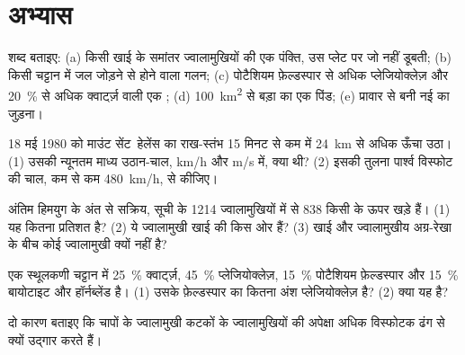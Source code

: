 \section{अभ्यास}

\begin{exercise}[$\star$]\label{exo:g12:subduction-magmatism:1}
शब्द बताइए: (a) किसी खाई के समांतर ज्वालामुखियों की एक पंक्ति, उस प्लेट पर
जो नहीं डूबती; (b) किसी चट्टान में जल जोड़ने से होने वाला गलन; (c) पोटैशियम
फ़ेल्डस्पार से अधिक प्लेजियोक्लेज़ और \qty{20}{\percent} से अधिक क्वार्ट्ज़ वाली एक
; (d) \qty{100}{km^2} से बड़ा  का
एक पिंड; (e) प्रावार से बनी नई  का
जुड़ना।
\end{exercise}

\begin{exercise}[$\star$]\label{exo:g12:subduction-magmatism:2}
18 मई 1980 को माउंट सेंट~हेलेंस का राख-स्तंभ 15 मिनट से कम में \qty{24}{km} से
अधिक ऊँचा उठा। (1) उसकी न्यूनतम माध्य उठान-चाल,
\unit{km/h} और \unit{m/s} में, क्या थी? (2) इसकी तुलना पार्श्व
विस्फोट की चाल, कम से कम \qty{480}{km/h}, से कीजिए।
\end{exercise}

\begin{exercise}[$\star$]\label{exo:g12:subduction-magmatism:3}
अंतिम हिमयुग के अंत से सक्रिय, सूची के 1214 ज्वालामुखियों में से
838 किसी  के ऊपर खड़े हैं। (1) यह कितना प्रतिशत है? (2) ये ज्वालामुखी
खाई की किस ओर हैं? (3) खाई और ज्वालामुखीय अग्र-रेखा के बीच कोई ज्वालामुखी
क्यों नहीं है?
\end{exercise}

\begin{exercise}[$\star$]\label{exo:g12:subduction-magmatism:4}
एक स्थूलकणी चट्टान में \qty{25}{\percent} क्वार्ट्ज़, \qty{45}{\percent}
प्लेजियोक्लेज़, \qty{15}{\percent} पोटैशियम फ़ेल्डस्पार और \qty{15}{\percent}
बायोटाइट और हॉर्नब्लेंड है। (1) उसके फ़ेल्डस्पार का कितना अंश प्लेजियोक्लेज़ है?
(2) क्या यह  है?
\end{exercise}

\begin{exercise}[$\star$]\label{exo:g12:subduction-magmatism:5}
दो कारण बताइए कि चापों के ज्वालामुखी कटकों के ज्वालामुखियों की अपेक्षा अधिक विस्फोटक ढंग से
क्यों उद्गार करते हैं।
\end{exercise}

